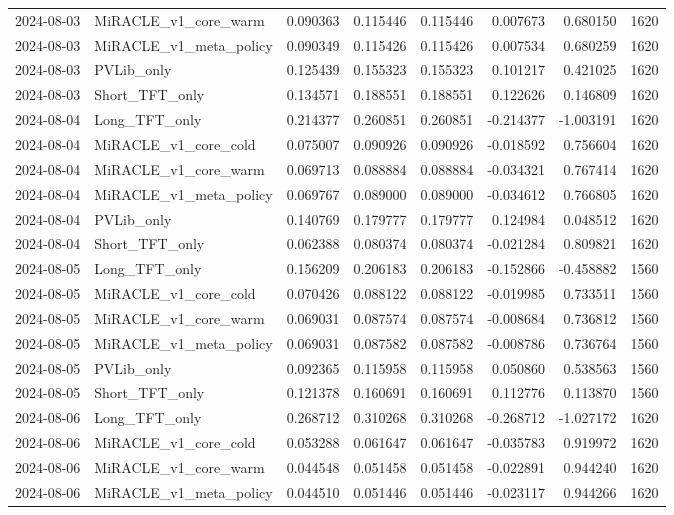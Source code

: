 \begin{tabular}{llrrrrrr}
2024-08-03 & MiRACLE_v1_core_warm & 0.090363 & 0.115446 & 0.115446 & 0.007673 & 0.680150 & 1620 \\
2024-08-03 & MiRACLE_v1_meta_policy & 0.090349 & 0.115426 & 0.115426 & 0.007534 & 0.680259 & 1620 \\
2024-08-03 & PVLib_only & 0.125439 & 0.155323 & 0.155323 & 0.101217 & 0.421025 & 1620 \\
2024-08-03 & Short_TFT_only & 0.134571 & 0.188551 & 0.188551 & 0.122626 & 0.146809 & 1620 \\
2024-08-04 & Long_TFT_only & 0.214377 & 0.260851 & 0.260851 & -0.214377 & -1.003191 & 1620 \\
2024-08-04 & MiRACLE_v1_core_cold & 0.075007 & 0.090926 & 0.090926 & -0.018592 & 0.756604 & 1620 \\
2024-08-04 & MiRACLE_v1_core_warm & 0.069713 & 0.088884 & 0.088884 & -0.034321 & 0.767414 & 1620 \\
2024-08-04 & MiRACLE_v1_meta_policy & 0.069767 & 0.089000 & 0.089000 & -0.034612 & 0.766805 & 1620 \\
2024-08-04 & PVLib_only & 0.140769 & 0.179777 & 0.179777 & 0.124984 & 0.048512 & 1620 \\
2024-08-04 & Short_TFT_only & 0.062388 & 0.080374 & 0.080374 & -0.021284 & 0.809821 & 1620 \\
2024-08-05 & Long_TFT_only & 0.156209 & 0.206183 & 0.206183 & -0.152866 & -0.458882 & 1560 \\
2024-08-05 & MiRACLE_v1_core_cold & 0.070426 & 0.088122 & 0.088122 & -0.019985 & 0.733511 & 1560 \\
2024-08-05 & MiRACLE_v1_core_warm & 0.069031 & 0.087574 & 0.087574 & -0.008684 & 0.736812 & 1560 \\
2024-08-05 & MiRACLE_v1_meta_policy & 0.069031 & 0.087582 & 0.087582 & -0.008786 & 0.736764 & 1560 \\
2024-08-05 & PVLib_only & 0.092365 & 0.115958 & 0.115958 & 0.050860 & 0.538563 & 1560 \\
2024-08-05 & Short_TFT_only & 0.121378 & 0.160691 & 0.160691 & 0.112776 & 0.113870 & 1560 \\
2024-08-06 & Long_TFT_only & 0.268712 & 0.310268 & 0.310268 & -0.268712 & -1.027172 & 1620 \\
2024-08-06 & MiRACLE_v1_core_cold & 0.053288 & 0.061647 & 0.061647 & -0.035783 & 0.919972 & 1620 \\
2024-08-06 & MiRACLE_v1_core_warm & 0.044548 & 0.051458 & 0.051458 & -0.022891 & 0.944240 & 1620 \\
2024-08-06 & MiRACLE_v1_meta_policy & 0.044510 & 0.051446 & 0.051446 & -0.023117 & 0.944266 & 1620 \\

\end{tabular}
